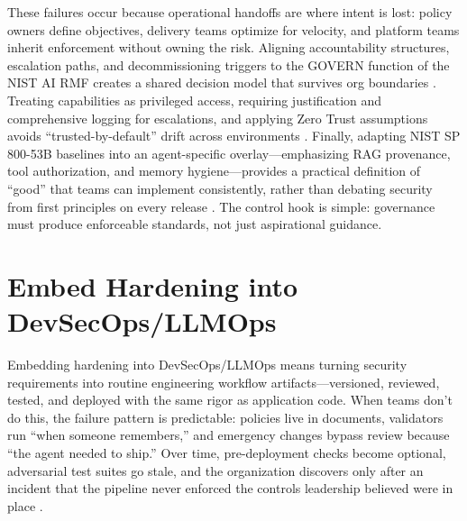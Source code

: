 \begin{TNtwocol}
  These failures occur because operational handoffs are where intent is lost: policy owners define objectives, delivery teams optimize for velocity, and platform teams inherit enforcement without owning the risk. Aligning accountability structures, escalation paths, and decommissioning triggers to the GOVERN function of the NIST AI RMF creates a shared decision model that survives org boundaries \cite{nist-airmf-100-1,nist-genai-600-1}. Treating capabilities as privileged access, requiring justification and comprehensive logging for escalations, and applying Zero Trust assumptions avoids “trusted-by-default” drift across environments \cite{nist-sp800-207,cisa-ztmm-v2}. Finally, adapting NIST SP 800-53B baselines into an agent-specific overlay—emphasizing RAG provenance, tool authorization, and memory hygiene—provides a practical definition of “good” that teams can implement consistently, rather than debating security from first principles on every release \cite{nist-sp800-53b,owasp-top10-llm-2025}. The control hook is simple: governance must produce enforceable standards, not just aspirational guidance.

  \section{Embed Hardening into DevSecOps/LLMOps}

  Embedding hardening into DevSecOps/LLMOps means turning security requirements into routine engineering workflow artifacts—versioned, reviewed, tested, and deployed with the same rigor as application code. When teams don't do this, the failure pattern is predictable: policies live in documents, validators run “when someone remembers,” and emergency changes bypass review because “the agent needed to ship.” Over time, pre-deployment checks become optional, adversarial test suites go stale, and the organization discovers only after an incident that the pipeline never enforced the controls leadership believed were in place \cite{nist-sp800-218,nist-sp800-53b}.


\end{TNtwocol}
